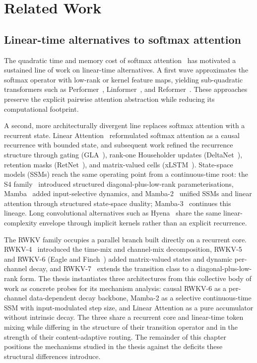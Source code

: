 \chapter{Related Work}

\section{Linear-time alternatives to softmax attention}

The quadratic time and memory cost of softmax
attention~\cite{vaswani2017attention} has motivated a sustained
line of work on linear-time alternatives. A first wave
approximates the softmax operator with low-rank or kernel feature
maps, yielding sub-quadratic transformers such as
Performer~\cite{choromanski2021performer},
Linformer~\cite{wang2020linformer}, and
Reformer~\cite{kitaev2020reformer}. These approaches preserve the
explicit pairwise attention abstraction while reducing its
computational footprint.

A second, more architecturally divergent line replaces softmax
attention with a recurrent state. Linear
Attention~\cite{katharopoulos2020transformers} reformulated
softmax attention as a causal recurrence with bounded state, and
subsequent work refined the recurrence structure through gating
(GLA~\cite{yang2024gla}), rank-one Householder updates
(DeltaNet~\cite{schlag2021deltanet,yang2024deltanet}), retention
masks (RetNet~\cite{sun2023retnet}), and matrix-valued cells
(xLSTM~\cite{beck2024xlstm}). State-space models (SSMs) reach the
same operating point from a continuous-time root: the S4
family~\cite{gu2022s4} introduced structured diagonal-plus-low-rank
parameterisations, Mamba~\cite{gu2023mamba} added input-selective
dynamics, and Mamba-2~\cite{dao2024transformers} unified SSMs and
linear attention through structured state-space duality;
Mamba-3~\cite{lahoti2026mamba3} continues this lineage. Long
convolutional alternatives such as Hyena~\cite{poli2023hyena}
share the same linear-complexity envelope through implicit
kernels rather than an explicit recurrence.

The RWKV family occupies a parallel branch built directly on a
recurrent core. RWKV-4~\cite{peng2023rwkv} introduced the
time-mix and channel-mix decomposition, RWKV-5 and RWKV-6 (Eagle
and Finch~\cite{peng2024eaglefinch}) added matrix-valued states
and dynamic per-channel decay, and RWKV-7~\cite{peng2025rwkv7}
extends the transition class to a diagonal-plus-low-rank form.
The thesis instantiates three architectures from this collective
body of work as concrete probes for its mechanism analysis:
causal RWKV-6 as a per-channel data-dependent decay backbone,
Mamba-2 as a selective continuous-time SSM with input-modulated
step size, and Linear Attention as a pure accumulator without
intrinsic decay. The three share a recurrent core and linear-time
token mixing while differing in the structure of their transition
operator and in the strength of their content-adaptive routing.
The remainder of this chapter positions the mechanisms studied
in the thesis against the deficits these structural differences
introduce.

